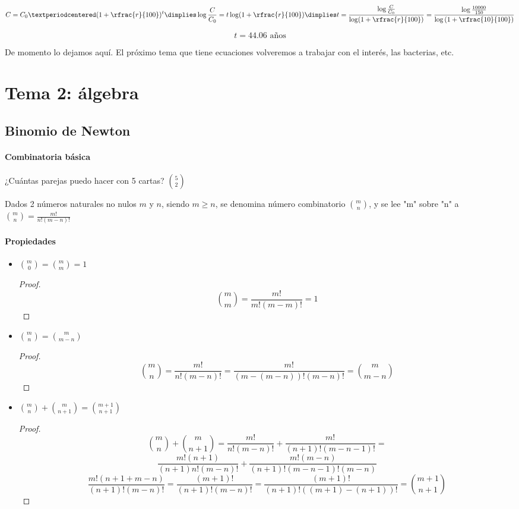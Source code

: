 \[
	C = C_0·(1+\rfrac{r}{100})^{t} \dimplies \log\frac{C}{C_0} = t\log(1+\rfrac{r}{100}) \dimplies t = \frac{\log\frac{C}{C_0}}{\log(1+\rfrac{r}{100})} = \frac{\log\frac{10000}{150}}{\log\left(1+\rfrac{10}{100}\right)} 
\]

\[
	t = 44.06\text{ años}
\]

De momento lo dejamos aquí. El próximo tema que tiene ecuaciones volveremos a trabajar con el interés, las bacterias, etc.


\section{Tema 2: álgebra}

\subsection{Binomio de Newton}

\paragraph{Combinatoria básica} ¿Cuántas parejas puedo hacer con 5 cartas? $\binom{5}{2}$

\begin{defn} Dados 2 números naturales no nulos $m$ y $n$, siendo $m≥n$, se denomina número combinatorio $\binom{m}{n}$, y se lee "m" sobre "n" a $\binom{m}{n} = \frac{m!}{n!(m-n)!}$
\end{defn}

\paragraph{Propiedades}
\begin{itemize}
	\item $\binom{m}{0}=\binom{m}{m}=1$
	\begin{proof}
		\[\binom{m}{m} = \frac{m!}{m!(m-m)!} = 1\]
	\end{proof}
	\item $\binom{m}{n}=\binom{m}{m-n}$ 
	\begin{proof}
		\[\binom{m}{n} = \frac{m!}{n!(m-n)!} = \frac{m!}{(m-(m-n))!(m-n)!} = \binom{m}{m-n} \]
	\end{proof}
	\item $\binom{m}{n} + \binom{m}{n+1}=\binom{m+1}{n+1}$
	\begin{proof}
		\[
			\binom{m}{n} + \binom{m}{n+1} = \frac{m!}{n!(m-n)!} + \frac{m!}{(n+1)!(m-n-1)!} = 
		\]
		\[
			\frac{m!(n+1)}{(n+1)n!(m-n)!} + \frac{m!(m-n)}{(n+1)!(m-n-1)!(m-n)}
		\]
		\[
			\frac{m!(n+1+m-n)}{(n+1)!(m-n)!} = \frac{(m+1)!}{(n+1)!(m-n)!} = 
		\frac{(m+1)!}{(n+1)!((m+1)-(n+1))!} = \binom{m+1}{n+1}
		\]
	\end{proof}
\end{itemize}

